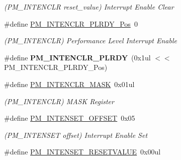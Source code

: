 \begin{DoxyCompactItemize}
\begin{DoxyCompactList}\small\item\em (P\+M\+\_\+\+I\+N\+T\+E\+N\+C\+L\+R reset\+\_\+value) Interrupt Enable Clear \end{DoxyCompactList}\item 
\hypertarget{group___s_a_m_l21___p_m_ga9c350f6edeab9f5d4280cc16a009539c}{}\#define \hyperlink{group___s_a_m_l21___p_m_ga9c350f6edeab9f5d4280cc16a009539c}{P\+M\+\_\+\+I\+N\+T\+E\+N\+C\+L\+R\+\_\+\+P\+L\+R\+D\+Y\+\_\+\+Pos}~0\label{group___s_a_m_l21___p_m_ga9c350f6edeab9f5d4280cc16a009539c}

\begin{DoxyCompactList}\small\item\em (P\+M\+\_\+\+I\+N\+T\+E\+N\+C\+L\+R) Performance Level Interrupt Enable \end{DoxyCompactList}\item 
\hypertarget{group___s_a_m_l21___p_m_ga17c1003415c61f410afb15d3feb5b00a}{}\#define {\bfseries P\+M\+\_\+\+I\+N\+T\+E\+N\+C\+L\+R\+\_\+\+P\+L\+R\+D\+Y}~(0x1ul $<$$<$ P\+M\+\_\+\+I\+N\+T\+E\+N\+C\+L\+R\+\_\+\+P\+L\+R\+D\+Y\+\_\+\+Pos)\label{group___s_a_m_l21___p_m_ga17c1003415c61f410afb15d3feb5b00a}

\item 
\hypertarget{group___s_a_m_l21___p_m_ga69858d0d83319582e961338ebf0e6def}{}\#define \hyperlink{group___s_a_m_l21___p_m_ga69858d0d83319582e961338ebf0e6def}{P\+M\+\_\+\+I\+N\+T\+E\+N\+C\+L\+R\+\_\+\+M\+A\+S\+K}~0x01ul\label{group___s_a_m_l21___p_m_ga69858d0d83319582e961338ebf0e6def}

\begin{DoxyCompactList}\small\item\em (P\+M\+\_\+\+I\+N\+T\+E\+N\+C\+L\+R) M\+A\+S\+K Register \end{DoxyCompactList}\item 
\hypertarget{group___s_a_m_l21___p_m_gacbb9e160784aa556b444d77c22d69b5e}{}\#define \hyperlink{group___s_a_m_l21___p_m_gacbb9e160784aa556b444d77c22d69b5e}{P\+M\+\_\+\+I\+N\+T\+E\+N\+S\+E\+T\+\_\+\+O\+F\+F\+S\+E\+T}~0x05\label{group___s_a_m_l21___p_m_gacbb9e160784aa556b444d77c22d69b5e}

\begin{DoxyCompactList}\small\item\em (P\+M\+\_\+\+I\+N\+T\+E\+N\+S\+E\+T offset) Interrupt Enable Set \end{DoxyCompactList}\item 
\hypertarget{group___s_a_m_l21___p_m_ga1ff5cf286622565d1fdcfcae1e552bfd}{}\#define \hyperlink{group___s_a_m_l21___p_m_ga1ff5cf286622565d1fdcfcae1e552bfd}{P\+M\+\_\+\+I\+N\+T\+E\+N\+S\+E\+T\+\_\+\+R\+E\+S\+E\+T\+V\+A\+L\+U\+E}~0x00ul\label{group___s_a_m_l21___p_m_ga1ff5cf286622565d1fdcfcae1e552bfd}


\end{DoxyCompactItemize}
